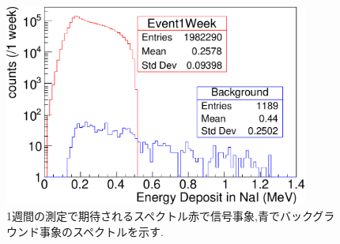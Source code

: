 \begin{figure}[!tbp]
	\centering
		\includegraphics[width=10cm]{fig/test_all.pdf}
	\caption[1週間の測定で期待されるスペクトル]{1週間の測定で期待されるスペクトル\newline 赤で信号事象,青でバックグラウンド事象のスペクトルを示す.}
	\label{test_all}
\end{figure}

